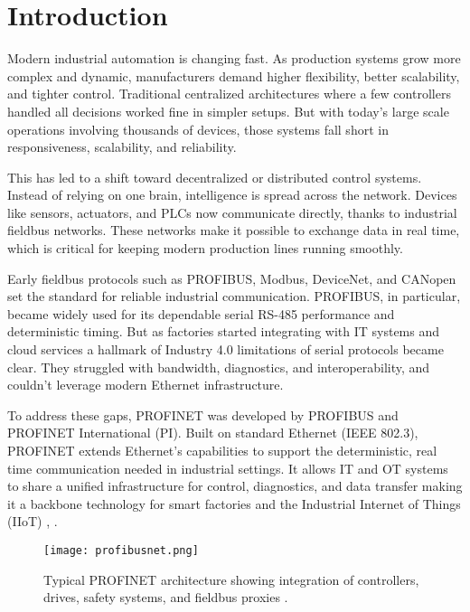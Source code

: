 \documentclass[conference]{IEEEtran}
\begin{document}
\section{Introduction}
Modern industrial automation is changing fast. As production systems grow more complex and dynamic, manufacturers demand higher flexibility, better scalability, and tighter control. Traditional centralized architectures where a few controllers handled all decisions worked fine in simpler setups. But with today’s large scale operations involving thousands of devices, those systems fall short in responsiveness, scalability, and reliability.

This has led to a shift toward decentralized or distributed control systems. Instead of relying on one brain, intelligence is spread across the network. Devices like sensors, actuators, and PLCs now communicate directly, thanks to industrial fieldbus networks. These networks make it possible to exchange data in real time, which is critical for keeping modern production lines running smoothly.

Early fieldbus protocols such as PROFIBUS, Modbus, DeviceNet, and CANopen set the standard for reliable industrial communication. PROFIBUS, in particular, became widely used for its dependable serial RS-485 performance and deterministic timing. But as factories started integrating with IT systems and cloud services a hallmark of Industry 4.0 limitations of serial protocols became clear. They struggled with bandwidth, diagnostics, and interoperability, and couldn’t leverage modern Ethernet infrastructure.

To address these gaps, PROFINET was developed by PROFIBUS and PROFINET International (PI). Built on standard Ethernet (IEEE 802.3), PROFINET extends Ethernet’s capabilities to support the deterministic, real time communication needed in industrial settings. It allows IT and OT systems to share a unified infrastructure for control, diagnostics, and data transfer making it a backbone technology for smart factories and the Industrial Internet of Things (IIoT) \cite{galloway2012industrial}, \cite{neumann2007communication}.

\begin{figure}[H]
    \centering
    \texttt{[image: profibusnet.png]}
    \caption{Typical PROFINET architecture showing integration of controllers, drives, safety systems, and fieldbus proxies \cite{profinetQA}.}
    \label{fig:profinet_architecture}
\end{figure}
\end{document}
